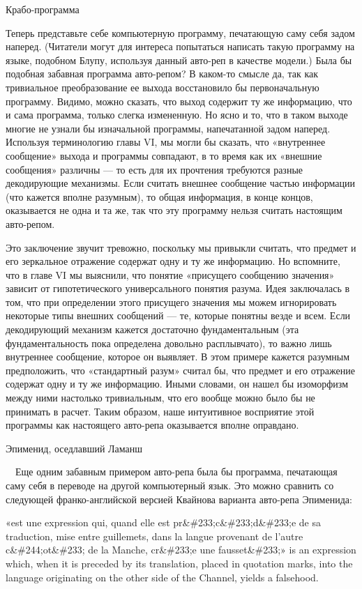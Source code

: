 Крабо-программа

Теперь представьте себе компьютерную программу, печатающую саму себя задом наперед. (Читатели могут для интереса попытаться написать такую программу на языке, подобном Блупу, используя данный авто-реп в качестве модели.) Была бы подобная забавная программа авто-репом? В каком-то смысле да, так как тривиальное преобразование ее выхода восстановило бы первоначальную программу. Видимо, можно сказать, что выход содержит ту же информацию, что и сама программа, только слегка измененную. Но ясно и то, что в таком выходе многие не узнали бы изначальной программы, напечатанной задом наперед. Используя терминологию главы VI, мы могли бы сказать, что «внутреннее сообщение» выхода и программы совпадают, в то время как их «внешние сообщения» различны --- то есть для их прочтения требуются разные декодирующие механизмы. Если считать внешнее сообщение частью информации (что кажется вполне разумным), то общая информация, в конце концов, оказывается не одна и та же, так что эту программу нельзя считать настоящим авто-репом.

Это заключение звучит тревожно, поскольку мы привыкли считать, что предмет и его зеркальное отражение содержат одну и ту же информацию. Но вспомните, что в главе VI мы выяснили, что понятие «присущего сообщению значения» зависит от гипотетического универсального понятия разума. Идея заключалась в том, что при определении этого присущего значения мы можем игнорировать некоторые типы внешних сообщений --- те, которые понятны везде и всем. Если декодирующий механизм кажется достаточно фундаментальным (эта фундаментальность пока определена довольно расплывчато), то важно лишь внутреннее сообщение, которое он выявляет. В этом примере кажется разумным предположить, что «стандартный разум» считал бы, что предмет и его отражение содержат одну и ту же информацию. Иными словами, он нашел бы изоморфизм между ними настолько тривиальным, что его вообще можно было бы не принимать в расчет. Таким образом, наше интуитивное восприятие этой программы как настоящего авто-репа оказывается вполне оправдано.

Эпименид, оседлавший Ламанш

~~Еще одним забавным примером авто-репа была бы программа, печатающая саму себя в переводе на другой компьютерный язык. Это можно сравнить со следующей франко-английской версией Квайнова варианта авто-репа Эпименида:

«est une expression qui, quand elle est pr\&\#233;c\&\#233;d\&\#233;e de sa traduction, mise entre guillemets, dans la langue provenant de l'autre c\&\#244;ot\&\#233; de la Manche, cr\&\#233;e une fausset\&\#233;» is an expression which, when it is preceded by its translation, placed in quotation marks, into the language originating on the other side of the Channel, yields a falsehood.

